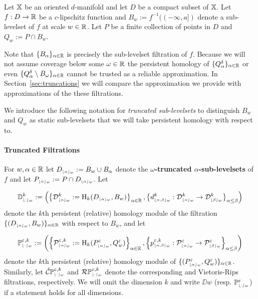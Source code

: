 
Let $\X$ be an oriented $d$-manifold and let $D$ be a compact subset of $\X$.
Let $f: D\to\R$ be a $c$-lipschitz function and $B_w := f^{-1}((-\infty,a])$ denote a sub-levelset of $f$ at scale $w\in\R$.
Let $P$ be a finite collection of points in $D$ and $Q_w := P\cap B_w$.

Note that $\{B_\alpha\}_{\alpha\in\R}$ is precisely the sub-levelset filtration of $f$.
Because we will not assume coverage below some $\omega\in\R$ the persistent homology of $\{Q_\alpha^\delta\}_{\alpha\in\R}$ or even $\{Q_\alpha^\delta\setminus B_\omega\}_{\alpha\in\R}$ cannot be trusted as a reliable approximation.
In Section~\ref{sec:truncations} we will compare the approximation we provide with approximations of the these filtrations.

We introduce the following notation for \emph{truncated sub-levelsets} to distinguish $B_w$ and $Q_w$ as static sub-levelsets that we will take persistent homology with respect to.

\paragraph{Truncated Filtrations}

For $w,\alpha\in\R$ let $D\subi{w}{\alpha} := B_w\cup B_\alpha$ denote the \textbf{$\omega$-truncated $\alpha$-sub-levelsets} of $f$ and let $P\subi{w}{\alpha} := P\cap D\subi{w}{\alpha}$.
%
Let %

\[ \DD{w}^k := \left(\left\{\D{w}{\alpha}^k := \hom_k(D\subi{w}{\alpha},B_w)\right\}_{\alpha\in\R},\left\{d\subi{w}{\alpha,\beta}^k : \D{w}{\alpha}^k\to\D{w}{\beta}^k\right\}_{\alpha\leq\beta}\right)\]
denote the $k$th persistent (relative) homology module of the filtration $\{(D\subi{w}{\alpha},B_w)\}_{\alpha\in\R}$ with respect to $B_w$, and let

\[\PP{w}{\e,k} := \left(\left\{\P{w}{\e,k}{\alpha} := \hom_k(P\subi{w}{\alpha}^\e,Q_w^\e)\right\}_{\alpha\in\R}, \left\{p\subi{w}{\alpha,\beta}^{\e,k} : \P{w}{\e}{\alpha}\to\P{w}{\e}{\beta}\right\}_{\alpha\leq\beta}\right)\]
denote the $k$th persistent (relative) homology module of $\{(P\subi{w}{\alpha}^\e,Q_w^\e)\}_{\alpha\in\R}$.
Similarly, let $\CPP{w}{\e,k}$ and $\RPP{w}{\e,k}$ denote the corresponding \Cech and Vietoris-Rips filtrations, respectively.
We will omit the dimension $k$ and write $\DD{w}$ (resp. $\PP{w}{\e}$) if a statement holds for all dimensions.

